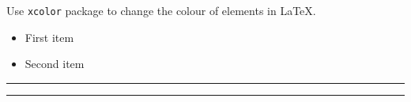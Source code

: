 \documentclass{article}
\begin{document}
Use \texttt{xcolor} package to change the colour of elements in \LaTeX.

\begin{itemize}
\item \textcolor{myColor1}{First item}
\item \textcolor{myColor2}{Second item}
\end{itemize}

\noindent
{\color{LightRubineRed} \rule{\linewidth}{1mm} }

\noindent
{\color{RubineRed} \rule{\linewidth}{1mm} }
\end{document}

